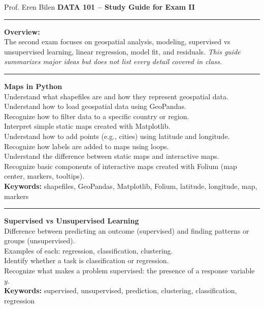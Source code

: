 \documentclass[12pt]{article}
\begin{document}
\vspace*{-0.8cm}
\noindent Prof. Eren Bilen
\hfill
\textbf{DATA 101 – Study Guide for Exam II}

\bigskip
\hrule
\bigskip

\noindent
\textbf{Overview:} \\[2pt]
The second exam focuses on geospatial analysis, modeling, supervised vs unsupervised learning, linear regression, model fit, and residuals.
\textit{This guide summarizes major ideas but does not list every detail covered in class.}


\bigskip
\hrule
\bigskip

\noindent
\textbf{Maps in Python} \\[4pt]
Understand what shapefiles are and how they represent geospatial data.
Understand how to load geospatial data using GeoPandas.\\
Recognize how to filter data to a specific country or region.\\
Interpret simple static maps created with Matplotlib.\\
Understand how to add points (e.g., cities) using latitude and longitude.\\
Recognize how labels are added to maps using loops.\\
Understand the difference between static maps and interactive maps.\\
Recognize basic components of interactive maps created with Folium (map center, markers, tooltips).\\
\textbf{Keywords:} shapefiles, GeoPandas, Matplotlib, Folium, latitude, longitude, map, markers

\bigskip
\hrule
\bigskip


\noindent
\textbf{Supervised vs Unsupervised Learning} \\[4pt]
Difference between predicting an outcome (supervised) and finding patterns or groups (unsupervised).\\
Examples of each: regression, classification, clustering.\\
Identify whether a task is classification or regression.\\
Recognize what makes a problem supervised: the presence of a response variable \(y\).\\
\textbf{Keywords:} supervised, unsupervised, prediction, clustering, classification, regression
\end{document}

